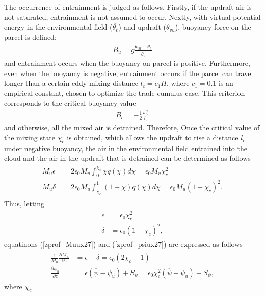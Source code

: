 The occurrence of entrainment is judged as follows. Firstly, if the updraft air is not saturated, entrainment is not assumed to occur. Nextly, with virtual potential energy in the environmental field
(\(\overline{\theta_v}\)) and updraft (\(\theta_{vu}\)), buoyancy force on the parcel is defined: \begin{eqnarray}\label{buoy_u}
    B_u = g\frac{\theta_{vu} - \overline{\theta_{v}}}{ \overline{\theta_v}}\end{eqnarray} and entrainment occurs when the buoyancy on parcel is positive. Furthermore, even when the buoyancy is negative,
entrainment occurs if the parcel can travel longer than a certain eddy mixing distance \(l_c=c_1 H\), where \(c_1=0.1\) is an empirical constant, chosen to optimize the trade-cumulus case. This
criterion corresponds to the critical buoyancy value \begin{eqnarray}\label{buoy_c}
    B_c = -\frac{1}{2}\frac{w_u^2}{l_c}\end{eqnarray} and otherwise, all the mixed air is detrained. Therefore, Once the critical value of the mixing state \(\chi_c\) is obtained, which allows the updraft to rise
a distance \(l_c\) under negative buoyancy, the air in the environmental field entrained into the cloud and the air in the updraft that is detrained can be determined as follows \begin{eqnarray}\begin{aligned}
    M_u\epsilon&=2\epsilon_0 M_u\int_0^{\chi_c}\chi q(\chi) d\chi = \epsilon_0 M_u \chi_c^2 \label{flux_entre}\\
    M_u\delta&=2\epsilon_0 M_u\int_{\chi_c}^{1}(1-\chi) q(\chi) d\chi = \epsilon_0 M_u (1-\chi_c)^2. \label{flux_detre}\end{aligned}\end{eqnarray} Thus, letting \begin{eqnarray}\begin{aligned}
    \epsilon&=\epsilon_0\chi_c^2 \label{Etilde}\\
    \delta&=\epsilon_0(1-\chi_c)^2, \label{Dtilde}\end{aligned}\end{eqnarray} equatinons (\ref{zprof_Muux27}{}) and (\ref{zprof_psiux27}) are expressed as follows \begin{eqnarray}\begin{aligned}
    \frac{1}{M_u}\frac{\partial M_u}{\partial z} &= \epsilon - \delta = \epsilon_0(2\chi_c - 1) \label{zprof_Mu_param}\\
    \frac{\partial \psi_u}{\partial z} &= \epsilon (\overline{\psi}-\psi_u) + S_{\psi} = \epsilon_0\chi_c^2(\overline{\psi}-\psi_u) + S_{\psi}, \label{zprof_psi_param}\end{aligned}\end{eqnarray} where \(\chi_c\)
